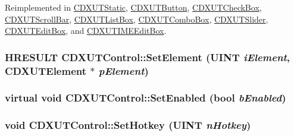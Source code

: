 Reimplemented in \hyperlink{class_c_d_x_u_t_static_a7237fbf3accc077c35c2dd79b9bd2e3e}{CDXUTStatic}, \hyperlink{class_c_d_x_u_t_button_a75a837a8eca0777b51d3aac6de6d6144}{CDXUTButton}, \hyperlink{class_c_d_x_u_t_check_box_a518c5e4d5250b1c0be83bf456c43f8b8}{CDXUTCheckBox}, \hyperlink{class_c_d_x_u_t_scroll_bar_a57f6ed8cfcb605406dc8500e8ff86538}{CDXUTScrollBar}, \hyperlink{class_c_d_x_u_t_list_box_a7c7284c4fd33fc3d074d3477b3e54d60}{CDXUTListBox}, \hyperlink{class_c_d_x_u_t_combo_box_affcd25fdf9baf53e39e7b50e58ee05d4}{CDXUTComboBox}, \hyperlink{class_c_d_x_u_t_slider_aaddc1a6d901a7601792f2f40cbcce501}{CDXUTSlider}, \hyperlink{class_c_d_x_u_t_edit_box_af36e6dfc05fb96ee4f60544cc402e760}{CDXUTEditBox}, and \hyperlink{class_c_d_x_u_t_i_m_e_edit_box_aa473937c56d6feef6777fd62b4d5a48c}{CDXUTIMEEditBox}.\hypertarget{class_c_d_x_u_t_control_a9aff35c5836ad9406f7ec3f8bedde0d6}{
\subsubsection[{SetElement}]{\setlength{\rightskip}{0pt plus 5cm}HRESULT CDXUTControl::SetElement (UINT {\em iElement}, \/  {\bf CDXUTElement} $\ast$ {\em pElement})}}
\label{class_c_d_x_u_t_control_a9aff35c5836ad9406f7ec3f8bedde0d6}
\hypertarget{class_c_d_x_u_t_control_afd0951616c5e521a12746df0637364f7}{
\subsubsection[{SetEnabled}]{\setlength{\rightskip}{0pt plus 5cm}virtual void CDXUTControl::SetEnabled (bool {\em bEnabled})}}
\label{class_c_d_x_u_t_control_afd0951616c5e521a12746df0637364f7}
\hypertarget{class_c_d_x_u_t_control_a020165444594a5fa2391ee2ef133e355}{
\subsubsection[{SetHotkey}]{\setlength{\rightskip}{0pt plus 5cm}void CDXUTControl::SetHotkey (UINT {\em nHotkey})}}
\label{class_c_d_x_u_t_control_a020165444594a5fa2391ee2ef133e355}
